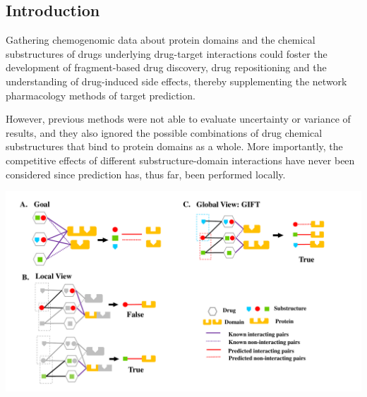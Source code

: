\documentclass[a0,portrait]{a0poster}
\begin{document}
\begin{multicols}{2}

\color{SaddleBrown} %

\section*{Introduction}
Gathering chemogenomic data about protein domains and the chemical substructures of drugs underlying drug-target interactions could foster the development of fragment-based drug discovery, drug repositioning and the understanding of drug-induced side effects, thereby supplementing the network pharmacology methods of target prediction.

However, previous methods were not able to evaluate uncertainty or variance of results, and they also ignored the possible combinations of drug chemical substructures that bind to protein domains as a whole. More importantly, the competitive effects of different substructure-domain interactions have never been considered since prediction has, thus far, been performed locally.

\begin{center}\vspace{1cm}
  \includegraphics[width=\linewidth]{explains_v2}
\end{center}\vspace{1cm}


\end{multicols}
\end{document}
